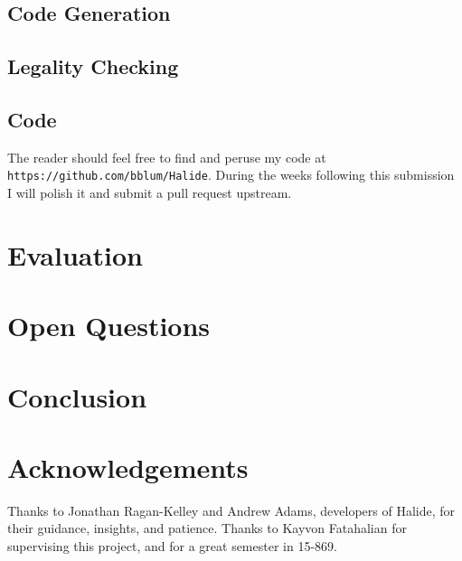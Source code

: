 \documentclass{article}
\begin{document}
\subsection{Code Generation}

\subsection{Legality Checking}

\subsection{Code}

The reader should feel free to find and peruse my code at \texttt{https://github.com/bblum/Halide}. During the weeks following this submission I will polish it and submit a pull request upstream.

\section{Evaluation}

\section{Open Questions}

\section{Conclusion}

\section*{Acknowledgements}

Thanks to Jonathan Ragan-Kelley and Andrew Adams, developers of Halide, for their guidance, insights, and patience. Thanks to Kayvon Fatahalian for supervising this project, and for a great semester in 15-869.

{}

\end{document}
